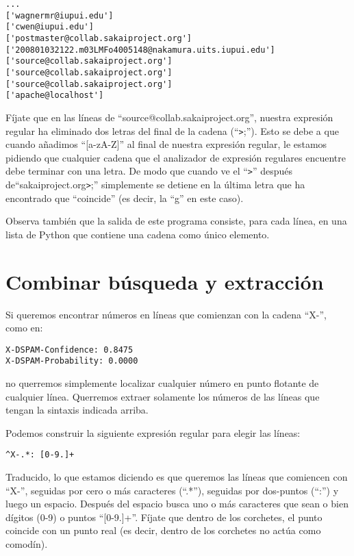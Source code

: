 \beforeverb
\begin{verbatim}
...
['wagnermr@iupui.edu']
['cwen@iupui.edu']
['postmaster@collab.sakaiproject.org']
['200801032122.m03LMFo4005148@nakamura.uits.iupui.edu']
['source@collab.sakaiproject.org']
['source@collab.sakaiproject.org']
['source@collab.sakaiproject.org']
['apache@localhost']
\end{verbatim}
\afterverb
%
Fíjate que en las líneas de ``source@collab.sakaiproject.org'', nuestra expresión regular
ha eliminado dos letras del final de la cadena (``\verb">";''). Esto se debe a que cuando
añadimos ``[a-zA-Z]'' al final de nuestra expresión regular, le estamos pidiendo que cualquier
cadena que el analizador de expresión regulares encuentre debe terminar con una letra. De modo que cuando ve el
``\verb">"'' después de``sakaiproject.org\verb">";'' simplemente se detiene en la última letra que
ha encontrado que ``coincide'' (es decir, la ``g'' en este caso).

Observa también que la salida de este programa consiste, para cada línea, en una lista de Python que contiene
una cadena como único elemento.

\section{Combinar búsqueda y extracción}

Si queremos encontrar números en líneas que comienzan con la cadena ``X-'', como en:

\beforeverb
\begin{verbatim}
X-DSPAM-Confidence: 0.8475
X-DSPAM-Probability: 0.0000  
\end{verbatim}
\afterverb
%
no querremos simplemente localizar cualquier número en punto flotante de cualquier línea. Querremos extraer
solamente los números de las líneas que tengan la sintaxis indicada arriba.

Podemos construir la siguiente expresión regular para elegir las líneas:

\beforeverb
\begin{verbatim}
^X-.*: [0-9.]+
\end{verbatim}
\afterverb
%
Traducido, lo que estamos diciendo es que queremos las líneas que comiencen con ``X-'', seguidas por cero o
más caracteres (``.*''), seguidas por dos-puntos (``:'') y luego un espacio. Después del espacio busca
uno o más caracteres que sean o bien dígitos (0-9) o puntos ``[0-9.]+''.
Fíjate que dentro de los corchetes, el punto coincide con un punto real (es decir, dentro de los corchetes
no actúa como comodín).

